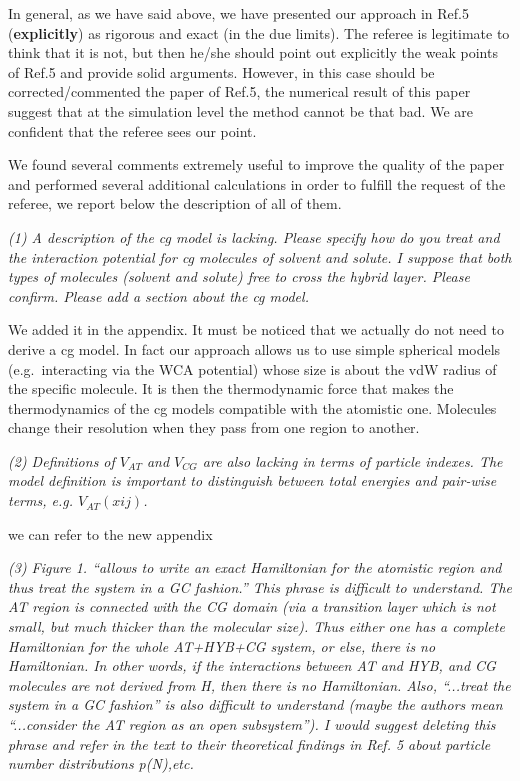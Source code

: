 \documentclass[12pt]{article}
\newcommand{\recheck}[1]{{\color{red} #1}}
\begin{document}
In general, as we have said above, we have presented our approach in
Ref.5 ({\bf explicitly}) as rigorous and exact (in the due limits).
The referee is legitimate to think that it is not, but then he/she
should point out explicitly the weak points of Ref.5 and provide solid
arguments.  However, in this case should be corrected/commented the
paper of Ref.5, the numerical result of this paper suggest that at the
simulation level the method cannot be that bad. We are confident that
the referee sees our point.

We found several comments extremely useful to improve the quality of the paper and performed several additional calculations in order to fulfill the request of the referee, we report below the description of all of them.

{\it (1) A description of the cg model is lacking. Please specify how
  do you treat and the interaction potential for cg molecules of
  solvent and solute. I suppose that both types of molecules (solvent
  and solute) free to cross the hybrid layer.  Please confirm. Please
  add a section about the cg model.}

We added it in the appendix. It must be noticed that we actually do
not need to derive a cg model. In fact our approach allows us to use
simple spherical models \recheck{(e.g.~interacting via the WCA potential)} whose size is about the vdW radius of the
specific molecule. It is
then the thermodynamic force that makes the thermodynamics of the cg
models compatible with the atomistic one. Molecules change their
resolution when they pass from one region to another.

{\it (2) Definitions of $V_{AT}$ and $V_{CG}$ are also lacking in terms of particle indexes. The model definition is important to distinguish between total energies and pair-wise terms, e.g. $V_{AT}(xij)$.}

\recheck{we can refer to the new appendix}

{\it (3) Figure 1. ``allows to write an exact Hamiltonian for the atomistic region and thus treat the system in a GC fashion.'' This phrase is
difficult to understand. The AT region is connected with the CG domain (via a transition layer which is not small, but much thicker than the
molecular size). Thus either one has a complete Hamiltonian for the whole AT+HYB+CG system, or else, there is no Hamiltonian. In other words, if
the interactions between AT and HYB, and CG molecules are not derived from H, then there is no Hamiltonian. Also, ``...treat the system in a GC
fashion'' is also difficult to understand (maybe the authors mean ``...consider the AT region as an open subsystem''). I would suggest
deleting this phrase and refer in the text to their theoretical findings in Ref. 5 about particle number distributions p(N),etc.}
\end{document}
